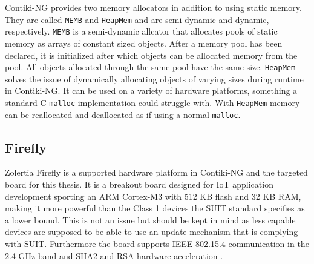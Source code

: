 \documentclass[0-thesis.tex]{subfiles}
\begin{document}
Contiki-NG provides two memory allocators in addition to using static memory. They are
called \texttt{MEMB} and \texttt{HeapMem} and are semi-dynamic and dynamic, respectively.
\texttt{MEMB} is a semi-dynamic allcator that allocates pools of static memory as arrays
of constant sized objects. After a memory pool has been declared, it is initialized after
which objects can be allocated memory from the pool. All objects allocated through the
same pool have the same size. \texttt{HeapMem} solves the issue of dynamically allocating
objects of varying sizes during runtime in Contiki-NG. It can be used on a variety of
hardware platforms, something a standard C \texttt{malloc} implementation could struggle
with. With \texttt{HeapMem} memory can be reallocated and deallocated as if using a normal
\texttt{malloc}.

\subsection{Firefly}
\label{ssec:firefly}
Zolertia Firefly is a supported hardware platform in Contiki-NG and the targeted board for
this thesis. It is a breakout board designed for IoT application development sporting an
ARM Cortex-M3 with 512 KB flash and 32 KB RAM, making it more powerful than the Class 1
devices the SUIT standard specifies as a lower bound. This is not an issue but should be
kept in mind as less capable devices are supposed to be able to use an update mechanism
that is complying with SUIT. Furthermore the board supports IEEE 802.15.4 communication in
the 2.4 GHz band and SHA2 and RSA hardware acceleration \parencite{firefly-datasheet}.
\end{document}

